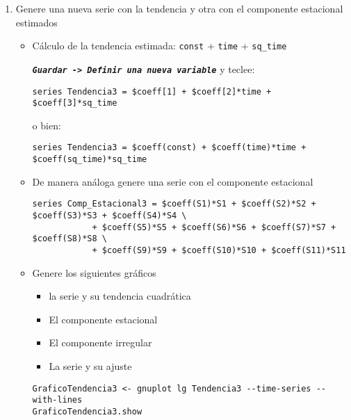 \documentclass[11pt]{article}
\begin{document}
\begin{enumerate}
\item Genere una nueva serie con la tendencia y otra con el componente estacional estimados
\label{sec:org0e028ca}
\begin{itemize}
\item Cálculo de la tendencia estimada:  \texttt{const} +  \texttt{time} +  \texttt{sq\_time}

\textbf{\emph{\texttt{Guardar -> Definir una nueva variable}}} y teclee:
{\vspace{1pt} \footnotesize \color{gray!70!black} \color{gray!70!black}
\begin{verbatim}
series Tendencia3 = $coeff[1] + $coeff[2]*time + $coeff[3]*sq_time
\end{verbatim}
}
o bien:
{\vspace{1pt} \footnotesize \color{gray!70!black} \color{gray!70!black}
\begin{verbatim}
series Tendencia3 = $coeff(const) + $coeff(time)*time + $coeff(sq_time)*sq_time
\end{verbatim}
}

\item De manera análoga genere una serie con el componente estacional

{\vspace{1pt} \footnotesize \color{gray!70!black} \color{gray!70!black}
\begin{verbatim}
series Comp_Estacional3 = $coeff(S1)*S1 + $coeff(S2)*S2 + $coeff(S3)*S3 + $coeff(S4)*S4 \
			+ $coeff(S5)*S5 + $coeff(S6)*S6 + $coeff(S7)*S7 + $coeff(S8)*S8 \
			+ $coeff(S9)*S9 + $coeff(S10)*S10 + $coeff(S11)*S11 
\end{verbatim}
}

\item Genere los siguientes gráficos
\begin{itemize}
\item la serie y su tendencia cuadrática

\item El componente estacional

\item El componente irregular

\item La serie y su ajuste
\end{itemize}

{\vspace{1pt} \footnotesize \color{gray!70!black} \color{gray!70!black}
\begin{verbatim}
GraficoTendencia3 <- gnuplot lg Tendencia3 --time-series --with-lines
GraficoTendencia3.show


\end{verbatim}}
\end{itemize}
\end{enumerate}
\end{document}
